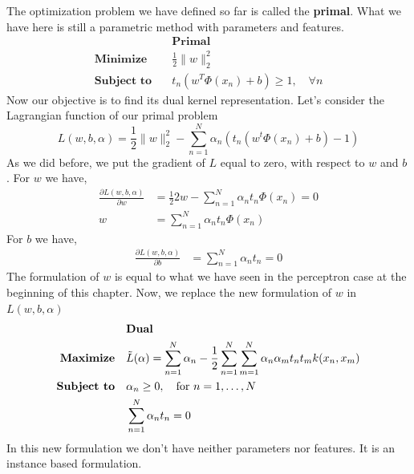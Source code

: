\documentclass[main.tex]{subfiles}
\begin{document}
The optimization problem we have defined so far is called the \textbf{primal}. What we have here is still a parametric method with parameters and features. 
\begin{align*}
    &\textbf{Primal} \\
    \textbf{Minimize} \quad &\frac{1}{2} \|w\|_2^2 \\
    \textbf{Subject to} \quad &t_n (w^T \Phi(x_n) + b) \geq 1, \quad \forall n
\end{align*}
Now our objective is to find its dual kernel representation.
Let's consider the Lagrangian function of our primal problem\footnotemark {}
\begin{equation}
    L(w,b,\alpha) = \frac{1}{2} \|w\|_2^2 - \sum_{n=1}^N \alpha_n (t_n(w^t \Phi(x_n) + b) - 1)
\end{equation}
\newpage
As we did before, we put the gradient of $L$ equal to zero, with respect to $w$ and $b$ \footnotemark.  
\newline
For $w$ we have,
\begin{align*}
    \frac{\partial L(w,b,\alpha)}{\partial w} &= \frac{1}{2} 2w - \sum_{n=1}^N \alpha_n t_n \Phi(x_n) = 0 \\
    w &= \sum_{n=1}^N \alpha_n t_n \Phi(x_n)
\end{align*}
For $b$ we have,
\begin{align*}
    \frac{\partial L(w,b,\alpha)}{\partial b} &= \sum_{n=1}^N \alpha_n t_n = 0
\end{align*}
The formulation of $w$ is equal to what we have seen in the perceptron case at the beginning of this chapter. Now, we replace the new formulation of $w$ in $L(w,b,\alpha)$
\begin{align*}
    &\textbf{Dual} \\
    \textbf{Maximize} \quad &\Tilde{L}(\alpha) = \sum_{n=1}^N \alpha_n - \frac{1}{2}\sum_{n=1}^N \sum_{m=1}^N \alpha_n \alpha_m t_n t_m k(x_n,x_m) \\
    \textbf{Subject to} \quad &\alpha_n \geq 0, \quad \text{for } n=1, \dots, N \\
    &\sum_{n=1}^N \alpha_n t_n = 0
\end{align*}
In this new formulation we don't have neither parameters nor features. It is an instance based formulation. 
\end{document}
